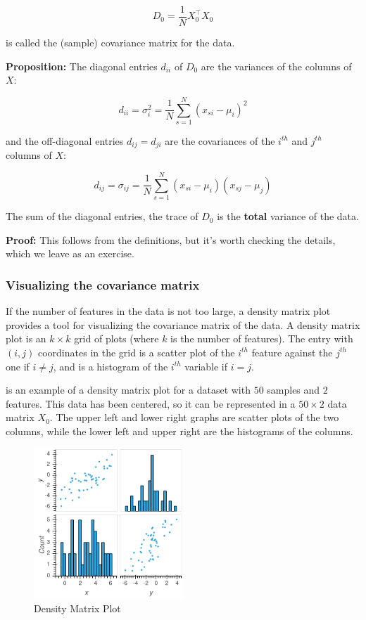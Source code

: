 \documentclass[
]{article}
\begin{document}
\[
D_{0} = \frac{1}{N}X_{0}^{\intercal}X_{0}
\]

is called the (sample) covariance matrix for the data.

\textbf{Proposition:} The diagonal entries \(d_{ii}\) of \(D_{0}\) are
the variances of the columns of \(X\):

\[
d_{ii} = \sigma_{i}^2 = \frac{1}{N}\sum_{s=1}^{N}(x_{si}-\mu_i)^2
\]

and the off-diagonal entries \(d_{ij} = d_{ji}\) are the covariances of
the \(i^{th}\) and \(j^{th}\) columns of \(X\):

\[
d_{ij} = \sigma_{ij} = \frac{1}{N}\sum_{s=1}^{N}(x_{si}-\mu_{i})(x_{sj}-\mu_{j})
\]

The sum of the diagonal entries, the trace of \(D_{0}\) is the
\textbf{total} variance of the data.

\textbf{Proof:} This follows from the definitions, but it's worth
checking the details, which we leave as an exercise.

\hypertarget{sec:visualizecovar}{%
\subsubsection{Visualizing the covariance
matrix}\label{sec:visualizecovar}}

If the number of features in the data is not too large, a density matrix
plot provides a tool for visualizing the covariance matrix of the data.
A density matrix plot is an \(k\times k\) grid of plots (where \(k\) is
the number of features). The entry with \((i,j)\) coordinates in the
grid is a scatter plot of the \(i^{th}\) feature against the \(j^{th}\)
one if \(i\not=j\), and is a histogram of the \(i^{th}\) variable if
\(i=j\).

 is an example of a density matrix plot for a dataset
with \(50\) samples and \(2\) features. This data has been centered, so
it can be represented in a \(50\times 2\) data matrix \(X_{0}\). The
upper left and lower right graphs are scatter plots of the two columns,
while the lower left and upper right are the histograms of the columns.

\begin{figure}
\hypertarget{fig:density0}{%
\centering
\includegraphics[width=0.5\textwidth,height=\textheight]{../img/density2x2.png}
\caption{Density Matrix Plot}\label{fig:density0}
}
\end{figure}
\end{document}

